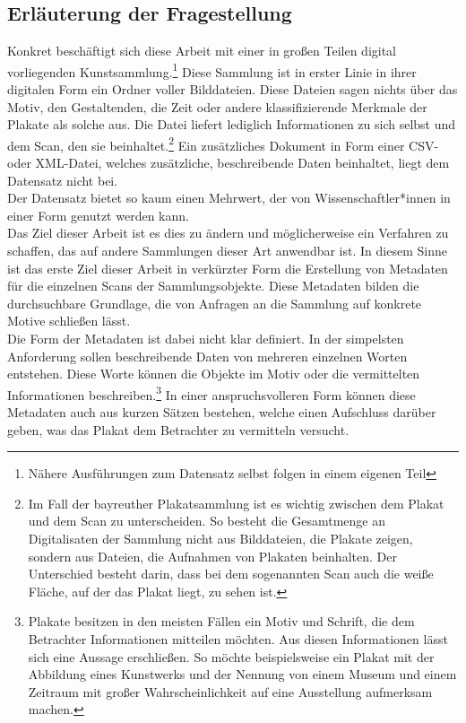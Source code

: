 \documentclass[a4paper,12pt,ngerman]{article}
\begin{document}
\subsection{Erläuterung der Fragestellung}
Konkret beschäftigt sich diese Arbeit mit einer in großen Teilen digital vorliegenden Kunstsammlung.\footnote{Nähere Ausführungen zum Datensatz selbst folgen in einem eigenen Teil}  Diese Sammlung ist in erster Linie in ihrer digitalen Form ein Ordner voller Bilddateien. Diese Dateien sagen nichts über das Motiv, den Gestaltenden, die Zeit oder andere klassifizierende Merkmale der Plakate als solche aus. Die Datei liefert lediglich Informationen zu sich selbst und dem Scan, den sie beinhaltet.\footnote{Im Fall der bayreuther Plakatsammlung ist es wichtig zwischen dem Plakat und dem Scan zu unterscheiden. So besteht die Gesamtmenge an Digitalisaten der Sammlung nicht aus Bilddateien, die Plakate zeigen, sondern aus Dateien, die Aufnahmen von Plakaten beinhalten. Der Unterschied besteht darin, dass bei dem sogenannten Scan auch die weiße Fläche, auf der das Plakat liegt, zu sehen ist.} Ein zusätzliches Dokument in Form einer CSV- oder XML-Datei, welches zusätzliche, beschreibende Daten beinhaltet, liegt dem Datensatz nicht bei. \\
Der Datensatz bietet so kaum einen Mehrwert, der von Wissenschaftler*innen in einer Form genutzt werden kann. \\
Das Ziel dieser Arbeit ist es dies zu ändern und möglicherweise ein Verfahren zu schaffen, das auf andere Sammlungen dieser Art anwendbar ist. In diesem Sinne ist das erste Ziel dieser Arbeit in verkürzter Form die Erstellung von Metadaten für die einzelnen Scans der Sammlungsobjekte. Diese Metadaten bilden die durchsuchbare Grundlage, die von Anfragen an die Sammlung auf konkrete Motive schließen lässt. \\
Die Form der Metadaten ist dabei nicht klar definiert. In der simpelsten Anforderung sollen beschreibende Daten von mehreren einzelnen Worten entstehen. Diese Worte können die Objekte im Motiv oder die vermittelten Informationen beschreiben.\footnote{Plakate besitzen in den meisten Fällen ein Motiv und Schrift, die dem Betrachter Informationen mitteilen möchten. Aus diesen Informationen lässt sich eine Aussage erschließen. So möchte beispielsweise ein Plakat mit der Abbildung eines Kunstwerks und der Nennung von einem Museum und einem Zeitraum mit großer Wahrscheinlichkeit auf eine Ausstellung aufmerksam machen.}  In einer anspruchsvolleren Form können diese Metadaten auch aus kurzen Sätzen bestehen, welche einen Aufschluss darüber geben, was das Plakat dem Betrachter zu vermitteln versucht. \\
\end{document}
